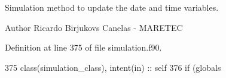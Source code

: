 Simulation method to update the date and time variables. 

\begin{DoxyAuthor}{Author}
Ricardo Birjukovs Canelas -\/ M\+A\+R\+E\+T\+EC 
\end{DoxyAuthor}


Definition at line 375 of file simulation.\+f90.


\begin{DoxyCode}
375     \textcolor{keywordtype}{class}(simulation\_class), \textcolor{keywordtype}{intent(in)} :: self
376     \textcolor{keywordflow}{if} (globals%
\end{DoxyCode}
